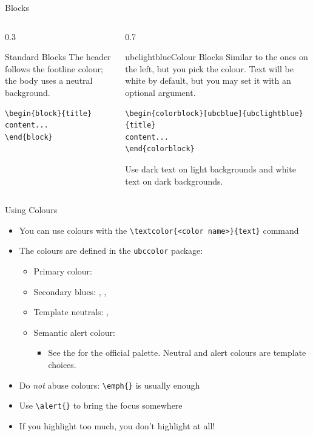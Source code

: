 \begin{frame}[fragile]{Blocks}
\begin{columns}
\begin{column}{0.3\textwidth}
\begin{block}{Standard Blocks}
The header follows the footline colour; the body uses a neutral background.
\begin{verbatim}
\begin{block}{title}
content...
\end{block}
\end{verbatim}
\end{block}
\end{column}
\begin{column}{0.7\textwidth}
\begin{colorblock}[ubcblue]{ubclightblue}{Colour Blocks}
Similar to the ones on the left, but you pick the colour. Text will be white by 
default, but you may set it with an optional argument.
\small
\begin{verbatim}
\begin{colorblock}[ubcblue]{ubclightblue}{title}
content...
\end{colorblock}
\end{verbatim}
\end{colorblock}
Use dark text on light backgrounds and white text on dark backgrounds.
\end{column}
\end{columns}
\end{frame}

\footlinecolor{}
\begin{frame}[fragile]{Using Colours}
\begin{itemize}[<alert@2>]
  \item You can use colours with the
        \verb|\textcolor{<color name>}{text}| command
  \item The colours are defined in the \texttt{ubccolor} package:
  \begin{itemize}
  \item Primary colour: 
  \item Secondary blues: ,
  , 
  \item Template neutrals: , 
  \item Semantic alert colour: 
        \begin{itemize}
        \item See the 
        for the official palette. Neutral and alert colours are template choices.
        \end{itemize}
  \end{itemize}
  \item Do \emph{not} abuse colours: \verb|\emph{}| is usually enough
  \item Use \verb|\alert{}| to bring the \alert<2->{focus} somewhere
  \item<2- | alert@2> If you highlight too much, you don't highlight at all!
\end{itemize}
\end{frame}


